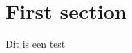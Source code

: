 \documentclass[a4paper,16pt]{article} %
\begin{document}
\section{First section}
Dit is een test
\end{document}
